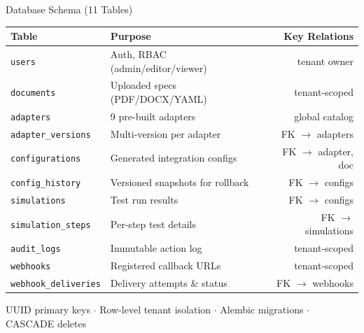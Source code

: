 \documentclass[aspectratio=169,11pt]{beamer}
\begin{document}
\begin{frame}{Database Schema (11 Tables)}
\begin{center}
{\small
\begin{tabular}{llr}
\toprule
\textbf{Table} & \textbf{Purpose} & \textbf{Key Relations} \\
\midrule
\texttt{users} & Auth, RBAC (admin/editor/viewer) & tenant owner \\
\texttt{documents} & Uploaded specs (PDF/DOCX/YAML) & tenant-scoped \\
\texttt{adapters} & 9 pre-built adapters & global catalog \\
\texttt{adapter\_versions} & Multi-version per adapter & FK $\to$ adapters \\
\texttt{configurations} & Generated integration configs & FK $\to$ adapter, doc \\
\texttt{config\_history} & Versioned snapshots for rollback & FK $\to$ configs \\
\texttt{simulations} & Test run results & FK $\to$ configs \\
\texttt{simulation\_steps} & Per-step test details & FK $\to$ simulations \\
\texttt{audit\_logs} & Immutable action log & tenant-scoped \\
\texttt{webhooks} & Registered callback URLs & tenant-scoped \\
\texttt{webhook\_deliveries} & Delivery attempts \& status & FK $\to$ webhooks \\
\bottomrule
\end{tabular}
}
\end{center}
\vspace{0.3em}
{\small\centering UUID primary keys $\cdot$ Row-level tenant isolation $\cdot$ Alembic migrations $\cdot$ CASCADE deletes\par}
\end{frame}
\end{document}
